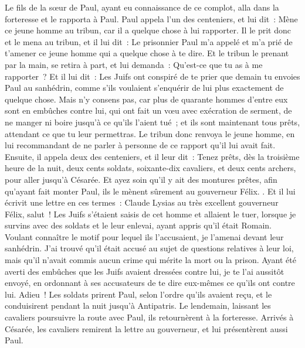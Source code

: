 \begin{multicols}{2}
Le fils de la sœur de Paul, ayant eu connaissance de ce complot, alla dans la forteresse et le rapporta à Paul.
Paul appela l'un des centeniers, et lui dit~: Mène ce jeune homme au tribun, car il a quelque chose à lui rapporter.
Il le prit donc et le mena au tribun, et il lui dit~: Le prisonnier Paul m'a appelé et m'a prié de t'amener ce jeune homme qui a quelque chose à te dire.
Et le tribun le prenant par la main, se retira à part, et lui demanda~: Qu'est-ce que tu as à me rapporter~?
Et il lui dit~: Les Juifs ont conspiré de te prier que demain tu envoies Paul au sanhédrin, comme s'ils voulaient s'enquérir de lui plus exactement de quelque chose.
Mais n'y consens pas, car plus de quarante hommes d'entre eux sont en embûches contre lui, qui ont fait un vœu avec exécration de serment, de ne manger ni boire jusqu'à ce qu'ils l'aient tué~; et ils sont maintenant tous prêts, attendant ce que tu leur permettras.
Le tribun donc renvoya le jeune homme, en lui recommandant de ne parler à personne de ce rapport qu'il lui avait fait.
Ensuite, il appela deux des centeniers, et il leur dit~: Tenez prêts, dès la troisième heure de la nuit, deux cents soldats, soixante-dix cavaliers, et deux cents archers, pour aller jusqu'à Césarée.
Et ayez soin qu'il y ait des montures prêtes, afin qu'ayant fait monter Paul, ils le mènent sûrement au gouverneur Félix. .
Et il lui écrivit une lettre en ces termes~:
Claude Lysias au très excellent gouverneur Félix, salut~!
Les Juifs s'étaient saisis de cet homme et allaient le tuer, lorsque je survins avec des soldats et le leur enlevai, ayant appris qu'il était Romain.
Voulant connaître le motif pour lequel ils l'accusaient, je l'amenai devant leur sanhédrin.
J'ai trouvé qu'il était accusé au sujet de questions relatives à leur loi, mais qu'il n'avait commis aucun crime qui mérite la mort ou la prison.
Ayant été averti des embûches que les Juifs avaient dressées contre lui, je te l'ai aussitôt envoyé, en ordonnant à ses accusateurs de te dire eux-mêmes ce qu'ils ont contre lui. Adieu~!
Les soldats prirent Paul, selon l'ordre qu'ils avaient reçu, et le conduisirent pendant la nuit jusqu'à Antipatris.
Le lendemain, laissant les cavaliers poursuivre la route avec Paul, ils retournèrent à la forteresse.
Arrivés à Césarée, les cavaliers remirent la lettre au gouverneur, et lui présentèrent aussi Paul.

\end{multicols}
